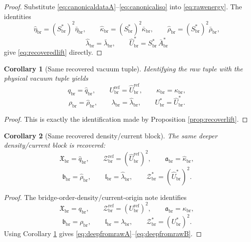 \documentclass[11pt]{article}
\newcommand{\RespDeepReadout}{\mathfrak X_{\mathrm{br}}}
\newcommand{\RespDeepDensityRef}{\mathcal Z_{\mathrm{br}}^{\mathrm{ref}}}
\newcommand{\RespDeepTrack}{\mathfrak a_{\mathrm{br}}}
\newcommand{\RespDeepRelax}{\mathfrak b_{\mathrm{br}}}
\newcommand{\RespDeepWell}{\mathfrak l_{\mathrm{br}}}
\newcommand{\RespDeepDensityEq}{\mathcal Z_{\mathrm{br}}^{\ast}}
\newcommand{\RespVacRef}{U_{\mathrm{br}}^{\mathrm{ref}}}
\newcommand{\RespVacEq}{U_{\mathrm{br}}^{\ast}}
\newcommand{\RespVacReadout}{q_{\mathrm{br}}}
\newcommand{\RespVacCov}{\kappa_{\mathrm{br}}}
\newcommand{\RespVacRelax}{\rho_{\mathrm{br}}}
\newcommand{\RespVacWell}{\lambda_{\mathrm{br}}}
\newcommand{\RespScaleEq}{S_{\mathrm{br}}^{\ast}}
\newcommand{\RespScaleCov}{\bar\kappa_{\mathrm{br}}}
\newcommand{\RespScaleRelax}{\bar\rho_{\mathrm{br}}}
\newcommand{\RespScaleWell}{\bar\lambda_{\mathrm{br}}}
\newcommand{\RespScaleAmpEq}{\bar A_{\mathrm{br}}^{\ast}}
\newcommand{\RespScaleIso}{\bar\eta_{\mathrm{br}}}
\newcommand{\RespRawReadout}{\widehat q_{\mathrm{br}}}
\newcommand{\RespRawRef}{\widehat U_{\mathrm{br}}^{\mathrm{ref}}}
\newcommand{\RespRawCov}{\widehat\kappa_{\mathrm{br}}}
\newcommand{\RespRawRelax}{\widehat\rho_{\mathrm{br}}}
\newcommand{\RespRawWell}{\widehat\lambda_{\mathrm{br}}}
\newcommand{\RespRawEq}{\widehat U_{\mathrm{br}}^{\ast}}
\newcommand{\RespRawIso}{\widehat\eta_{\mathrm{br}}}
\newtheorem{corollary}{Corollary}
\begin{document}
\begin{proof}
Substitute \eqref{eq:canonicaldataA}--\eqref{eq:canonicaliso} into \eqref{eq:rawenergy}. The identities
\[
\RespRawIso=(\RespScaleEq)^2\RespScaleIso,
\qquad
\RespRawCov=(\RespScaleEq)^2\RespScaleCov,
\qquad
\RespRawRelax=(\RespScaleEq)^2\RespScaleRelax,
\]
\[
\RespRawWell=\RespScaleWell,
\qquad
\RespRawEq=\RespScaleEq\,\RespScaleAmpEq
\]
give \eqref{eq:recoveredlift} directly.
\end{proof}

\begin{corollary}[Same recovered vacuum tuple]
\label{cor:samevacuumtuple}
Identifying the raw tuple with the physical vacuum tuple yields
\begin{equation}
\RespVacReadout=\RespRawReadout,
\qquad
\RespVacRef=\RespRawRef,
\qquad
\RespVacCov=\RespRawCov,
\label{eq:physicalrawA}
\end{equation}
\begin{equation}
\RespVacRelax=\RespRawRelax,
\qquad
\RespVacWell=\RespRawWell,
\qquad
\RespVacEq=\RespRawEq.
\label{eq:physicalrawB}
\end{equation}
\end{corollary}

\begin{proof}
This is exactly the identification made by Proposition \ref{prop:recoverlift}.
\end{proof}

\begin{corollary}[Same recovered density/current block]
\label{cor:samedeepblock}
The same deeper density/current block is recovered:
\begin{equation}
\RespDeepReadout=\RespRawReadout,
\qquad
\RespDeepDensityRef=(\RespRawRef)^2,
\qquad
\RespDeepTrack=\RespRawCov,
\label{eq:deepfromrawA}
\end{equation}
\begin{equation}
\RespDeepRelax=\RespRawRelax,
\qquad
\RespDeepWell=\RespRawWell,
\qquad
\RespDeepDensityEq=(\RespRawEq)^2.
\label{eq:deepfromrawB}
\end{equation}
\end{corollary}

\begin{proof}
The bridge-order-density/current-origin note identifies
\[
\RespDeepReadout=\RespVacReadout,
\qquad
\RespDeepDensityRef=(\RespVacRef)^2,
\qquad
\RespDeepTrack=\RespVacCov,
\]
\[
\RespDeepRelax=\RespVacRelax,
\qquad
\RespDeepWell=\RespVacWell,
\qquad
\RespDeepDensityEq=(\RespVacEq)^2.
\]
Using Corollary \ref{cor:samevacuumtuple} gives \eqref{eq:deepfromrawA}--\eqref{eq:deepfromrawB}.
\end{proof}
\end{document}
